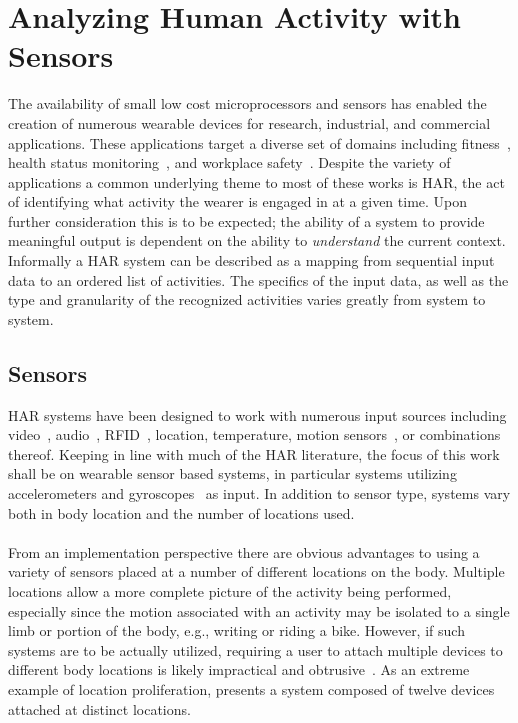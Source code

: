 \documentclass[12pt]{report}
\newcommand{\1}[0]{\mathbbm{1}}
\begin{document}
\chapter{Analyzing Human Activity with Sensors}
\label{chap:Analyzing Human Activity with Sensors}
The availability of small low cost microprocessors and sensors has
enabled the creation of numerous wearable devices for research, industrial,
and commercial applications. These applications target a diverse set of domains
including fitness~\cite{long-term-devices},
health status monitoring~\cite{elderly,health-survey},
and workplace safety~\cite{assembly-activity}.
Despite the variety of applications a common underlying theme to most of these
works is \ac{HAR}, the act of identifying what activity the wearer is engaged in at a given time.
Upon further consideration this is to be expected; the ability of a system to provide
meaningful output is dependent on the ability to \emph{understand} the current context.
Informally a \ac{HAR} system can be described as a mapping from sequential
input data to an ordered list of activities. The specifics of the input data, as well
as the type and granularity of the recognized activities varies greatly from system to system.

\section{Sensors}
\label{sec:HAR-Sensors}
\ac{HAR} systems have been designed to work with numerous input sources including
video~\cite{har-vision-survey},
audio~\cite{assembly-activity},
RFID~\cite{har-video-rfid},
location, temperature, motion sensors~\cite{har-survey},
or combinations thereof.
Keeping in line with much of the \ac{HAR} literature,
the focus of this work shall be on wearable sensor based systems,
in particular systems utilizing accelerometers and gyroscopes~\cite{multiple-sensor-bao}
as input. In addition to sensor type, systems vary both in body location
and the number of locations used.
\\\\
From an implementation perspective there are obvious advantages to using a
variety of sensors placed at a number of different locations on the body. Multiple
locations allow a more complete picture of the activity being performed,
especially since the motion associated with an activity may be isolated to a
single limb or portion of the body, e.g., writing or riding a bike. However, if such
systems are to be actually utilized, requiring a user to attach multiple devices to
different body locations is likely impractical and obtrusive~\cite{har-survey}.
As an extreme example of location proliferation, \cite{many-sensor-locations} presents a
system composed of twelve devices attached at distinct locations.
\end{document}
